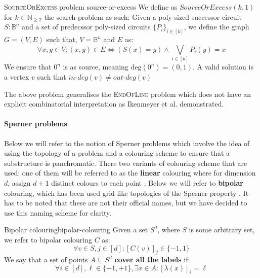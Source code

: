 \begin{definitionbox}{\textsc{SourceOrExcess} problem \cite{ikenmeyer_WhatWhatNot_2022}}{source-or-excess}
    We define as $\textit{SourceOrExcess}(k,1)$ for $k \in \mathbb{N}_{\geq 2}$
    the search problem as such: Given a poly-sized successor circuit $S : \mathbb{B}^n$
    and a set of predecssor poly-sized circuits $\{P_i\}_{i \in [k]}$, we define
    the graph $G = (V,E)$ such that, $V = \mathbb{B}^n$ and $E$ as:
    $$
    \forall x, y \in V: (x,y) \in E \iff (S(x) = y) \wedge \bigvee_{i \in [k]} P_i(y) = x
    $$
    We ensure that $0^n$ is as source, meaning $\text{deg}(0^n) = (0,1)$.
    A valid solution is a vertex $v$ such that $\textit{in-deg}(v) \neq \textit{out-deg}(v)$
\end{definitionbox}

The above problem generalises the \textsc{EndOfLine} problem which 
does not have an explicit combinatorial interpretation as Ikenmeyer et al. \cite{ikenmeyer_WhatWhatNot_2022}
demonstrated.

\paragraph{Sperner problems}

Below we will refer to the notion of Sperner problems which involve
the idea of using the topology of a problem and a colouring scheme to ensure
that a substructure is panchromatic. There two variants of colouring scheme
that are used: one of them will be referred to as the \textbf{linear} colouring
where for dimension $d$, assign $d+1$ distinct colours to each point \cite{daskalakis_ComplexityComputingNash_2006, chen_Complexity2DDiscrete_2009}.
Below we will refer to \textbf{bipolar} colouring, which has been used grid-like topologies of the Sperner property
\cite{chen_SettlingComplexityComputing_2009, deligkas_PureCircuitTightInapproximability_2024, daskalakis_ComplexityConstrainedMinmax_2021}.
It has to be noted that these are not their official names, but we have decided
to use this naming scheme for clarity.



\begin{definitionbox}{Bipolar colouring}{bipolar-colouring}
    Given a set $S^d$, where $S$ is some arbitrary set, we refer
    to bipolar colouring $C$ as:
    $$
    \forall v \in S, j \in [d]: [C(v)]_j \in \{-1,1\}
    $$
    We say that a set of points $A \subseteq S^d$ \textbf{cover all the labels} if:
    $$
        \forall i \in [d], \ell \in \{-1, +1\}, \exists x \in A: [\lambda(x)]_{i} = \ell
    $$

\end{definitionbox}

